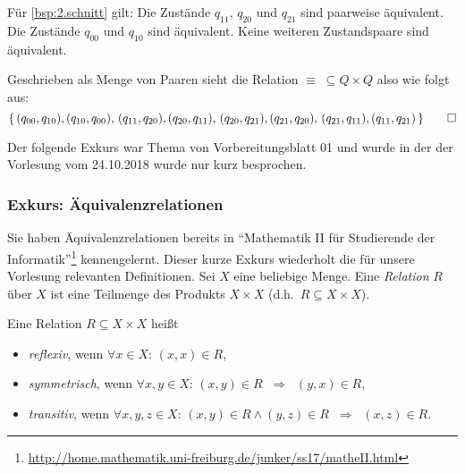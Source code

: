 \begin{Bsp}
Für \autoref{bsp:2.schnitt} gilt: 
Die Zustände $q_{11}$, $q_{20}$ und $q_{21}$ sind paarweise äquivalent.
Die Zustände $q_{00}$ und $q_{10}$ sind äquivalent.
Keine weiteren Zustandspaare sind äquivalent.

Geschrieben als Menge von Paaren sieht die Relation $\equiv\;\subseteq Q\times Q$ also wie folgt aus:
\[
\{ \,
(q_{00}, q_{10}), (q_{10}, q_{00}), \,
(q_{11}, q_{20}), (q_{20}, q_{11}), \,
(q_{20}, q_{21}), (q_{21}, q_{20}), \,
(q_{21}, q_{11}), (q_{11}, q_{21}) \,
\}\qedhere
\]
\end{Bsp}

{\color{green!60!black}
\begin{Bemerkung}
Der folgende Exkurs war Thema von Vorbereitungsblatt 01 und wurde in der der Vorlesung vom 24.10.2018 wurde nur kurz besprochen.
\end{Bemerkung}
}


\subsubsection{Exkurs: Äquivalenzrelationen}
Sie haben Äquivalenzrelationen bereits in "`Mathematik II für Studierende der Informatik"'\footnote{\url{http://home.mathematik.uni-freiburg.de/junker/ss17/matheII.html}} kennengelernt.
Dieser kurze Exkurs wiederholt die für unsere Vorlesung relevanten Definitionen.
Sei $X$ eine beliebige Menge. Eine \emph{Relation} $R$ über $X$ ist eine Teilmenge des Produkts $X\times X$ (d.h.\ $R\subseteq X\times X$).

Eine Relation $R\subseteq X\times X$ heißt
\begin{itemize}
 \item \emph{reflexiv}, wenn $\forall x\in X$: $(x,x)\in R$, 
 \item \emph{symmetrisch}, wenn $\forall x, y\in X$: $(x,y)\in R \;\; \Rightarrow\;\; (y,x)\in R$, 
 \item \emph{transitiv}, wenn $\forall x, y, z\in X$: $(x,y)\in R \land (y,z)\in R\;\; \Rightarrow\;\; (x,z)\in R$.
\end{itemize}

